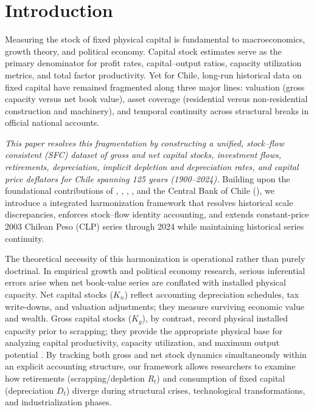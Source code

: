 \section{Introduction}\label{sec:intro}

Measuring the stock of fixed physical capital is fundamental to macroeconomics, growth theory, and political economy. Capital stock estimates serve as the primary denominator for profit rates, capital--output ratios, capacity utilization metrics, and total factor productivity. Yet for Chile, long-run historical data on fixed capital have remained fragmented along three major lines: valuation (gross capacity versus net book value), asset coverage (residential versus non-residential construction and machinery), and temporal continuity across structural breaks in official national accounts.

\emph{This paper resolves this fragmentation by constructing a unified, stock--flow consistent (SFC) dataset of gross and net capital stocks, investment flows, retirements, depreciation, implicit depletion and depreciation rates, and capital price deflators for Chile spanning 125 years (1900--2024).} Building upon the foundational contributions of \citet{Hofman2000a}, \citet{DiazWagner2016}, \citet{TafunellDucoing2016}, \citet{PerezEyzaguirre2019}, and the Central Bank of Chile (\citealt{BCCH2024}), we introduce a integrated harmonization framework that resolves historical scale discrepancies, enforces stock--flow identity accounting, and extends constant-price 2003 Chilean Peso (CLP) series through 2024 while maintaining historical series continuity.

The theoretical necessity of this harmonization is operational rather than purely doctrinal. In empirical growth and political economy research, serious inferential errors arise when net book-value series are conflated with installed physical capacity. Net capital stocks ($K_n$) reflect accounting depreciation schedules, tax write-downs, and valuation adjustments; they measure surviving economic value and wealth. Gross capital stocks ($K_g$), by contrast, record physical installed capacity prior to scrapping; they provide the appropriate physical base for analyzing capital productivity, capacity utilization, and maximum output potential \citep{BasuRama2013, Shaikh2016}. By tracking both gross and net stock dynamics simultaneously within an explicit accounting structure, our framework allows researchers to examine how retirements (scrapping/depletion $R_t$) and consumption of fixed capital (depreciation $D_t$) diverge during structural crises, technological transformations, and industrialization phases.

